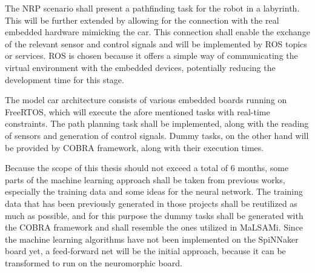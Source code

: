 The NRP scenario shall present a pathfinding task for the robot in a labyrinth. This will be further extended by allowing for the connection with the real embedded hardware mimicking the car. This connection shall enable the exchange of the relevant sensor and control signals and will be implemented by ROS topics or services. ROS is chosen because it offers a simple way of communicating the virtual environment with the embedded devices, potentially reducing the development time for this stage.

The model car architecture consists of various embedded boards running on FreeRTOS, which will execute the afore mentioned tasks with real-time constraints. The path planning task shall be implemented, along with the reading of sensors and generation of control signals. Dummy tasks, on the other hand will be provided by COBRA framework, along with their execution times. 

Because the scope of this thesis should not exceed a total of 6 months, some parts of the machine learning approach shall be taken from previous works, especially the training data and some ideas for the neural network. The training data that has been previously generated in those projects shall be reutilized as much as possible, and for this purpose the dummy tasks shall be generated with the COBRA framework and shall resemble the ones utilized in MaLSAMi. Since the machine learning algorithms have not been implemented on the SpiNNaker board yet, a feed-forward net will be the initial approach, because it can be transformed to run on the neuromorphic board.

